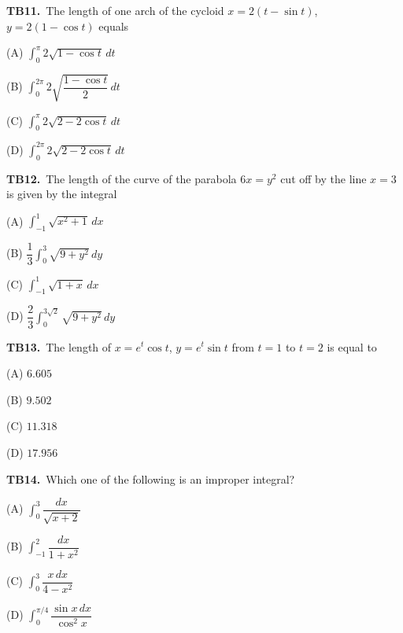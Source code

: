 \documentclass[11pt]{article}
\begin{document}
\bigskip\noindent\textbf{TB11.}\ The length of one arch of the cycloid $x=2(t-\sin t)$, $y=2(1-\cos t)$ equals
\begin{list}{}{\setlength{\leftmargin}{3em}\setlength{\labelwidth}{2.5em}\setlength{\itemsep}{0pt}\setlength{\topsep}{2pt}}
\item[(A)] $\displaystyle\int_0^{\pi} 2\sqrt{1-\cos t}\,dt$
\item[(B)] $\displaystyle\int_0^{2\pi} 2\sqrt{\dfrac{1-\cos t}{2}}\,dt$
\item[(C)] $\displaystyle\int_0^{\pi} 2\sqrt{2-2\cos t}\,dt$
\item[(D)] $\displaystyle\int_0^{2\pi} 2\sqrt{2-2\cos t}\,dt$
\end{list}

\bigskip\noindent\textbf{TB12.}\ The length of the curve of the parabola $6x=y^2$ cut off by the line $x=3$ is given by the integral
\begin{list}{}{\setlength{\leftmargin}{3em}\setlength{\labelwidth}{2.5em}\setlength{\itemsep}{0pt}\setlength{\topsep}{2pt}}
\item[(A)] $\displaystyle\int_{-1}^{1} \sqrt{x^2+1}\,dx$
\item[(B)] $\displaystyle\dfrac{1}{3}\int_0^3 \sqrt{9+y^2}\,dy$
\item[(C)] $\displaystyle\int_{-1}^{1} \sqrt{1+x}\,dx$
\item[(D)] $\displaystyle\dfrac{2}{3}\int_0^{3\sqrt{2}} \sqrt{9+y^2}\,dy$
\end{list}

\bigskip\noindent\textbf{TB13.}\ The length of $x=e^t\cos t$, $y=e^t\sin t$ from $t=1$ to $t=2$ is equal to
\begin{list}{}{\setlength{\leftmargin}{3em}\setlength{\labelwidth}{2.5em}\setlength{\itemsep}{0pt}\setlength{\topsep}{2pt}}
\item[(A)] $6.605$
\item[(B)] $9.502$
\item[(C)] $11.318$
\item[(D)] $17.956$
\end{list}

\bigskip\noindent\textbf{TB14.}\ Which one of the following is an improper integral?
\begin{list}{}{\setlength{\leftmargin}{3em}\setlength{\labelwidth}{2.5em}\setlength{\itemsep}{0pt}\setlength{\topsep}{2pt}}
\item[(A)] $\displaystyle\int_0^3 \dfrac{dx}{\sqrt{x+2}}$
\item[(B)] $\displaystyle\int_{-1}^2 \dfrac{dx}{1+x^2}$
\item[(C)] $\displaystyle\int_0^3 \dfrac{x\,dx}{4-x^2}$
\item[(D)] $\displaystyle\int_0^{\pi/4} \dfrac{\sin x\,dx}{\cos^2 x}$
\end{list}
\end{document}
